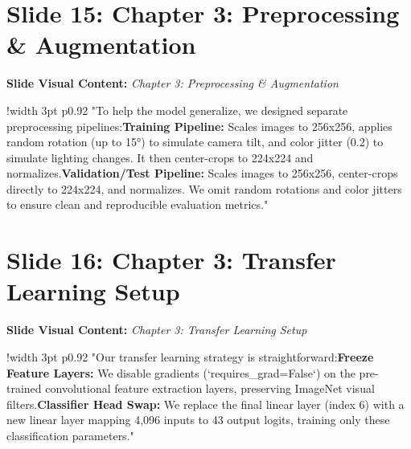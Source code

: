 \documentclass[11pt]{article}
\begin{document}
\section{Slide 15: Chapter 3: Preprocessing \& Augmentation}
\textbf{Slide Visual Content:} \textit{Chapter 3: Preprocessing \& Augmentation}\\ [8pt]
\noindent
\begin{tabular}{!{\color{primary}\vrule width 3pt} p{0.92\textwidth}}
  \small\color{black!80} "To help the model generalize, we designed separate preprocessing pipelines:\newline\newline *   \textbf{Training Pipeline:} Scales images to 256x256, applies random rotation (up to 15°) to simulate camera tilt, and color jitter (0.2) to simulate lighting changes. It then center-crops to 224x224 and normalizes.\newline\newline *   \textbf{Validation/Test Pipeline:} Scales images to 256x256, center-crops directly to 224x224, and normalizes. We omit random rotations and color jitters to ensure clean and reproducible evaluation metrics."
\end{tabular}
\vspace{15pt}

\section{Slide 16: Chapter 3: Transfer Learning Setup}
\textbf{Slide Visual Content:} \textit{Chapter 3: Transfer Learning Setup}\\ [8pt]
\noindent
\begin{tabular}{!{\color{primary}\vrule width 3pt} p{0.92\textwidth}}
  \small\color{black!80} "Our transfer learning strategy is straightforward:\newline\newline *   \textbf{Freeze Feature Layers:} We disable gradients (`requires\_grad=False`) on the pre-trained convolutional feature extraction layers, preserving ImageNet visual filters.\newline\newline *   \textbf{Classifier Head Swap:} We replace the final linear layer (index 6) with a new linear layer mapping 4,096 inputs to 43 output logits, training only these classification parameters."
\end{tabular}
\vspace{15pt}
\end{document}
